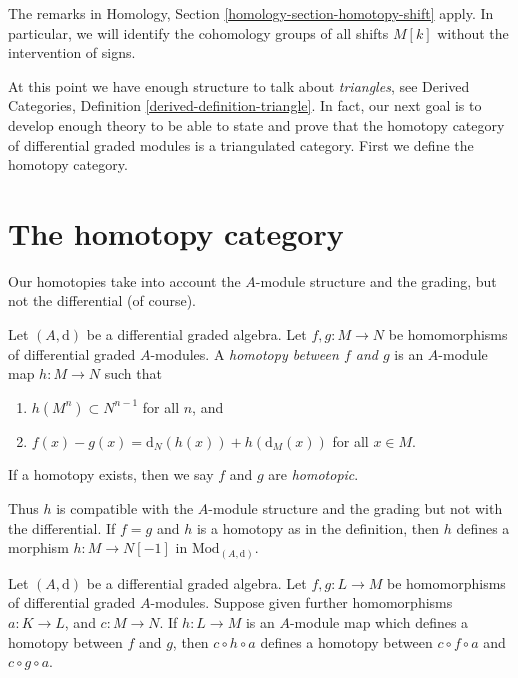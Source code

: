 \medskip\noindent
The remarks in Homology, Section \ref{homology-section-homotopy-shift} apply.
In particular, we will identify the cohomology groups of all shifts
$M[k]$ without the intervention of signs.

\medskip\noindent
At this point we have enough structure to talk about {\it triangles},
see Derived Categories, Definition \ref{derived-definition-triangle}.
In fact, our next goal is to develop enough theory to be able to
state and prove that the homotopy category of differential graded
modules is a triangulated category. First we define the homotopy category.






\section{The homotopy category}
\label{section-homotopy}

\noindent
Our homotopies take into account the $A$-module structure and the
grading, but not the differential (of course).

\begin{definition}
\label{definition-homotopy}
Let $(A, \text{d})$ be a differential graded algebra. Let
$f, g : M \to N$ be homomorphisms of differential graded $A$-modules.
A {\it homotopy between $f$ and $g$} is an $A$-module map $h : M \to N$
such that
\begin{enumerate}
\item $h(M^n) \subset N^{n - 1}$ for all $n$, and
\item $f(x) - g(x) = \text{d}_N(h(x)) + h(\text{d}_M(x))$ for
all $x \in M$.
\end{enumerate}
If a homotopy exists, then we say $f$ and $g$ are {\it homotopic}.
\end{definition}

\noindent
Thus $h$ is compatible with the $A$-module structure and the grading
but not with the differential. If $f = g$ and $h$ is a homotopy
as in the definition, then $h$ defines a morphism $h : M \to N[-1]$
in $\text{Mod}_{(A, \text{d})}$.

\begin{lemma}
\label{lemma-compose-homotopy}
Let $(A, \text{d})$ be a differential graded algebra.
Let $f, g : L \to M$ be homomorphisms of differential graded $A$-modules.
Suppose given further homomorphisms $a : K \to L$, and $c : M \to N$.
If $h : L \to M$ is an $A$-module map which defines a homotopy between
$f$ and $g$, then $c \circ h \circ a$ defines a homotopy between
$c \circ f \circ a$ and $c \circ g \circ a$.
\end{lemma}

